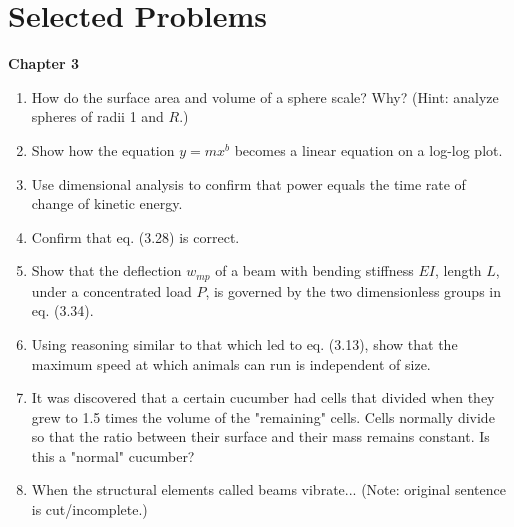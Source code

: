 \section*{Selected Problems}

\textbf{Chapter 3}
\begin{enumerate}
  \item[3.3] How do the surface area and volume of a sphere scale? Why? (Hint: analyze spheres of radii 1 and $R$.)
  \item[3.6] Show how the equation $y = m x^b$ becomes a linear equation on a log-log plot.
  \item[3.9] Use dimensional analysis to confirm that power equals the time rate of change of kinetic energy.
  \item[3.18] Confirm that eq. (3.28) is correct.
  \item[3.19] Show that the deflection $w_{mp}$ of a beam with bending stiffness $EI$, length $L$, under a concentrated load $P$, is governed by the two dimensionless groups in eq. (3.34).
  \item[3.28] Using reasoning similar to that which led to eq. (3.13), show that the maximum speed at which animals can run is independent of size.
  \item[3.32] It was discovered that a certain cucumber had cells that divided when they grew to 1.5 times the volume of the "remaining" cells. Cells normally divide so that the ratio between their surface and their mass remains constant. Is this a "normal" cucumber?
  \item[3.35] When the structural elements called beams vibrate... (Note: original sentence is cut/incomplete.)
\end{enumerate}

